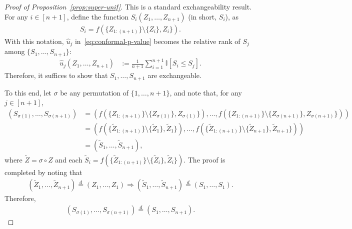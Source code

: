 \documentclass[11pt]{article}
\newcommand{\I}[1]{\mathbb{I}\left[#1\right]}
\begin{document}
\begin{proof}[Proof of Proposition~\ref{prop:super-unif}]
This is a standard exchangeability result. For any $i \in [n+1]$, define the function $S_i(Z_1,\ldots,Z_{n+1})$ (in short, $S_i$), as
\begin{align*}
  S_i = f(\{Z_{1:(n+1)}\} \setminus \{Z_i\}, Z_{i}\}).
\end{align*}
With this notation, $\hat{u}_j$ in~\eqref{eq:conformal-p-value} becomes the relative rank of $S_j$ among $\{S_1,\ldots,S_{n+1}\}$:
\begin{align} \label{eq:conformal-p-value}
  \hat{u}_j(Z_1,\ldots,Z_{n+1})
  & := \frac{1}{n+1} \sum_{i=1}^{n+1} \I{ S_i \leq S_j}.
\end{align}
Therefore, it suffices to show that $S_1,\ldots,S_{n+1}$ are exchangeable.

To this end, let $\sigma$ be any permutation of $\{1,\ldots,n+1\}$, and note that, for any $j \in [n+1]$,
\begin{align*}
  \left( S_{\sigma(1)}, \ldots, S_{\sigma(n+1)} \right)
  & = \left( f(\{Z_{1:(n+1)}\} \setminus \{Z_{\sigma(1)}\}, Z_{\sigma(1)}\}), \ldots, f(\{Z_{1:(n+1)}\} \setminus \{Z_{\sigma(n+1)}\}, Z_{\sigma(n+1)}\}) \right) \\
  & = \left( f(\{\tilde{Z}_{1:(n+1)}\} \setminus \{\tilde{Z}_{1}\}, \tilde{Z}_{1}\}), \ldots, f(\{\tilde{Z}_{1:(n+1)}\} \setminus \{\tilde{Z}_{n+1}\}, \tilde{Z}_{n+1}\}) \right) \\
  & = \left( \tilde{S}_{1}, \ldots, \tilde{S}_{n+1} \right),
\end{align*}
where $\tilde{Z} = \sigma \circ Z$ and each $\tilde{S}_i = f(\{\tilde{Z}_{1:(n+1)}\} \setminus \{\tilde{Z}_i\}, \tilde{Z}_{i}\})$.
The proof is completed by noting that 
\begin{align*}
  \left( \tilde{Z}_{1}, \ldots, \tilde{Z}_{n+1} \right) \overset{d}{=} \left( Z_{1}, \ldots, Z_{1} \right) \Longrightarrow
  \left( \tilde{S}_{1}, \ldots, \tilde{S}_{n+1} \right) \overset{d}{=} \left( S_{1}, \ldots, S_{1} \right).
\end{align*}
Therefore,
\begin{align*}
  \left( S_{\sigma(1)}, \ldots, S_{\sigma(n+1)} \right) \overset{d}{=} \left( S_{1}, \ldots, S_{n+1} \right).
\end{align*}
\end{proof}
\end{document}
